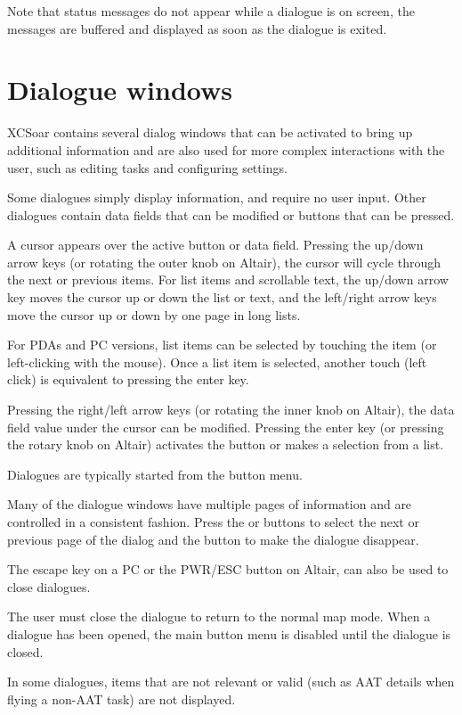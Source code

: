 Note that status messages do not appear while a dialogue is on screen, the
messages are buffered and displayed as soon as the dialogue is exited.

\section{Dialogue windows}\label{sec:dialog-windows}

XCSoar contains several dialog windows that can be activated to bring up
additional information and are also used for more complex interactions with the
user, such as editing tasks and configuring settings.

Some dialogues simply display information, and require no user input. Other
dialogues contain data fields that can be modified or buttons that can be pressed.  

A cursor appears over the active button or data field. Pressing the up/down
arrow keys (or rotating the outer knob on Altair), the cursor will cycle
through the next or previous items. For list items and scrollable text, the
up/down arrow key moves the cursor up or down the list or text, and the
left/right arrow keys move the cursor up or down by one page in long lists.

For PDAs and PC versions, list items can be selected by touching the item (or
left-clicking with the mouse). Once a list item is selected, another touch
(left click) is equivalent to pressing the enter key.

Pressing the right/left arrow keys (or rotating the inner knob on Altair), the
data field value under the cursor can be modified. Pressing the enter key (or
pressing the rotary knob on Altair) activates the button or makes a selection
from a list.

Dialogues are typically started from the button menu.  

Many of the dialogue windows have multiple pages of information and are controlled
in a consistent fashion. Press the \button{$<$} or \button{$>$} buttons to
select the next or previous page of the dialog and the  button to
make the dialogue disappear.

The escape key on a PC or the PWR/ESC button on Altair, can also be used to
close dialogues.

The user must close the dialogue to return to the normal map mode. When a dialogue
has been opened, the main button menu is disabled until the dialogue is closed.

In some dialogues, items that are not relevant or valid (such as AAT details when
flying a non-AAT task) are not displayed.


